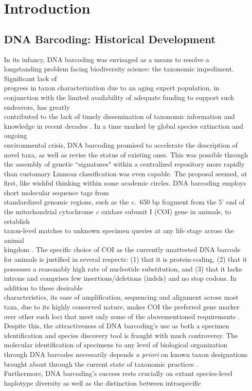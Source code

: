 \section{Introduction}

\subsection{DNA Barcoding: Historical Development}

In its infancy, DNA barcoding \cite{hebert2003biological}  was envisaged as a means to resolve a longstanding problem facing biodiversity science: the taxonomic impediment. 
Significant lack of \\ progress in taxon characterization due to an aging expert population, in conjunction with the limited availability of adequate funding to support such endeavors, has greatly \\ contributed to the lack of timely dissemination of taxonomic information and knowledge in recent decades \cite{cao2016rapid}. In a time marked by global species extinction and ongoing \\ environmental crisis, DNA barcoding promised to accelerate the description of novel taxa, as well as revise the status of existing ones. This was possible through the assembly of genetic ``signatures" within a centralized repository more rapidly than customary Linnean classification was even capable. The proposal seemed, at first, like wishful thinking within some academic circles. DNA barcoding employs short molecular sequence tags from \\ standardized genomic regions, such as the \textit{c.}~650 bp fragment from the 5' end of the mitochondrial cytochrome \textit{c} oxidase subunit I (COI) gene in animals, to establish \\ taxon-level matches to unknown specimen queries at any life stage across the animal \\ kingdom \cite{hebert2003barcoding}. The specific choice of COI as the currently unattested DNA barcode for animals is justified in several respects: (1) that it is protein-coding, (2) that it possesses a reasonably high rate of  nucleotide substitution, and (3) that it lacks introns and comprises few insertions/deletions (indels) and no stop codons. In addition to these desirable \\ characteristics, its ease of amplification, sequencing and alignment across most taxa, due to its highly conserved nature, makes COI the preferred gene marker over other such loci that meet only some of the abovementioned requirements \cite{phillips2019incomplete}. Despite this, the attractiveness of DNA barcoding's use as both a specimen identification and species discovery tool is fraught with much controversy. The molecular identification of specimens to any level of biological organization through DNA barcodes necessarily depends \textit{a priori} on known taxon designations brought about through the current state of taxonomic practices \cite{desalle2006species}. \\ Furthermore, DNA barcoding's success rests crucially on extant species-level haplotype diversity as well as the distinction between intraspecific 